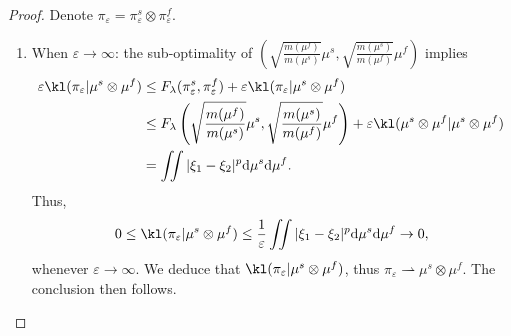 \begin{proof}
  Denote $\pi_{\varepsilon} = \pi_{\varepsilon}^s \otimes \pi_{\varepsilon}^f$.
  \begin{enumerate}
    \item When $\varepsilon \to \infty$: the sub-optimality of $\left( \sqrt{\frac{m(\mu^f)}{m(\mu^s)}} \mu^s, \sqrt{\frac{m(\mu^s)}{m(\mu^f)}} \mu^f \right)$ implies
    \begin{equation*}
      \begin{split}
        \varepsilon \kl(\pi_{\varepsilon} \vert \mu^s \otimes \mu^f)
        &\leq F_{\lambda}(\pi_{\varepsilon}^s, \pi_{\varepsilon}^f) +
        \varepsilon \kl(\pi_{\varepsilon} \vert \mu^s \otimes \mu^f) \\
        &\leq F_{\lambda} \left( \sqrt{\frac{m(\mu^f)}{m(\mu^s)}} \mu^s, \sqrt{\frac{m(\mu^s)}{m(\mu^f)}} \mu^f \right) +
        \varepsilon \kl( \mu^s \otimes \mu^f \vert \mu^s \otimes \mu^f) \\
        &= \iint \vert \xi_1 - \xi_2 \vert^p \mathrm d\mu^s \mathrm d\mu^f.
      \end{split}
    \end{equation*}
    Thus,
    \begin{equation*}
      0 \leq \kl(\pi_{\varepsilon} \vert \mu^s \otimes \mu^f)
      \leq \frac{1}{\varepsilon} \iint \vert \xi_1 - \xi_2 \vert^p
      \mathrm d\mu^s \mathrm d\mu^f \to 0,
    \end{equation*}
    whenever $\varepsilon \to \infty$. We deduce that $\kl(\pi_{\varepsilon} \vert \mu^s \otimes \mu^f)$,
    thus $\pi_{\varepsilon} \rightharpoonup \mu^s \otimes \mu^f$. The conclusion then follows.


\end{enumerate}
\end{proof}
